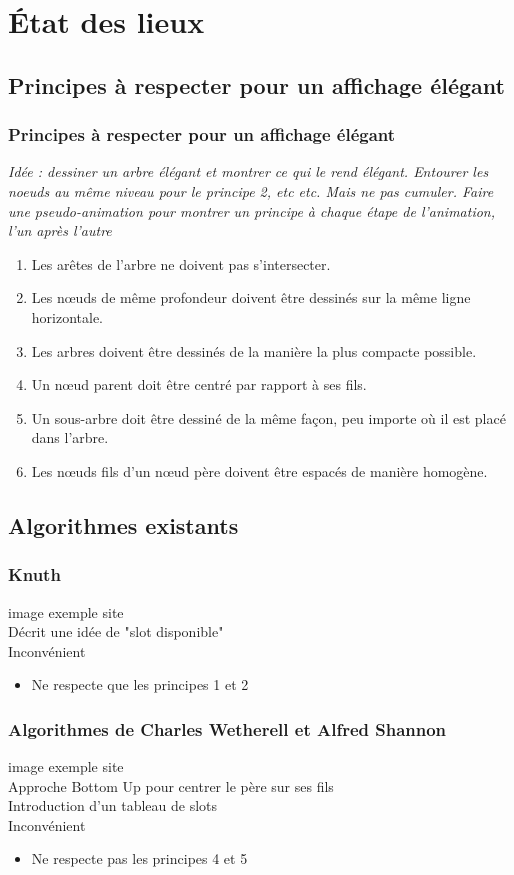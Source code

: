 \section{État des lieux}

\subsection{Principes à respecter pour un affichage élégant}

\begin{frame}
	\frametitle{Principes à respecter pour un affichage élégant}
	\textit{Idée : dessiner un arbre élégant et montrer ce qui le rend élégant. Entourer les noeuds au même niveau pour le principe 2, etc etc. Mais ne pas cumuler. Faire une pseudo-animation pour montrer un principe à chaque étape de l'animation, l'un après l'autre}
	\begin{enumerate}
		\item Les arêtes de l'arbre ne doivent pas s'intersecter.
		\item Les n\oe{}uds de même profondeur doivent être dessinés sur la même ligne horizontale.
		\item Les arbres doivent être dessinés de la manière la plus compacte possible.
		\item Un n\oe{}ud parent doit être centré par rapport à ses fils.
		\item Un sous-arbre doit être dessiné de la même façon, peu importe où il est placé dans l'arbre.
		\item Les n\oe{}uds fils d'un n\oe{}ud père doivent être espacés de manière homogène.
	\end{enumerate}
\end{frame}

\subsection{Algorithmes existants}

\begin{frame}
	\frametitle{Knuth}
	image exemple site \\
	Décrit une idée de "slot disponible"\\
	Inconvénient
	\begin{itemize}
		\item Ne respecte que les principes 1 et 2
	\end{itemize}
\end{frame}

\begin{frame}
	\frametitle{Algorithmes de Charles Wetherell et Alfred Shannon}
	image exemple site \\
	Approche Bottom Up pour centrer le père sur ses fils\\
	Introduction d'un tableau de slots\\
	Inconvénient
	\begin{itemize}
		\item Ne respecte pas les principes 4 et 5
	\end{itemize}
\end{frame}

